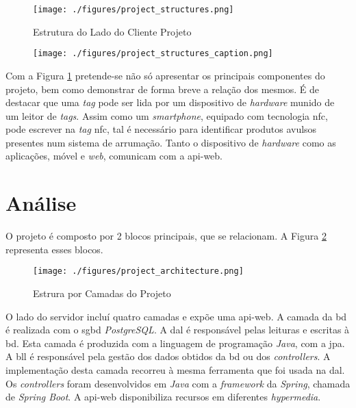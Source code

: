 \begin{figure}[H]
	\centering
	\texttt{[image: ./figures/project\_structures.png]}
	\caption{Estrutura do Lado do Cliente Projeto}
	\label{project-structure}
\end{figure}

\begin{figure}[H]
	\centering
	\texttt{[image: ./figures/project\_structures\_caption.png]}
\end{figure}

Com a Figura \ref{project-structure} pretende-se não só apresentar os principais componentes do projeto, bem como demonstrar de forma breve a relação dos mesmos. É de destacar que uma \textit{tag} pode ser lida por um dispositivo de \textit{hardware} munido de um leitor de \textit{tags}. Assim como um \textit{smartphone}, equipado com tecnologia \acrshort{nfc}, pode escrever na \textit{tag} \acrshort{nfc}, tal é necessário para identificar produtos avulsos presentes num sistema de arrumação. Tanto o dispositivo de \textit{hardware} como as aplicações, móvel e \textit{web}, comunicam com a \gls{api-web}.\\

%
%
\section{Análise}\label{sec32}

O projeto é composto por 2 blocos principais, que se relacionam. A Figura \ref{project-layers-structure} representa esses blocos. 

\begin{figure}[H]
	\centering
	\texttt{[image: ./figures/project\_architecture.png]}
	\caption{Estrura por Camadas do Projeto}
	\label{project-layers-structure}
\end{figure}

O lado do servidor incluí quatro camadas e expõe uma \gls{api-web}. A camada da \acrfull{bd} é realizada com o \acrfull{sgbd} \textit{PostgreSQL}. A \acrfull{dal} é responsável pelas leituras e escritas à \acrshort{bd}. Esta camada é produzida com a linguagem de programação \textit{Java}, com a \acrfull{jpa}. A \acrfull{bll} é responsável pela gestão dos dados obtidos da \acrshort{bd} ou dos \textit{controllers}. A implementação desta camada recorreu à mesma ferramenta que foi usada na \acrshort{dal}. Os \textit{controllers} foram desenvolvidos em \textit{Java} com a \textit{framework} da \textit{Spring}, chamada de \textit{Spring Boot}. A \gls{api-web} disponibiliza recursos em diferentes \textit{hypermedia}.

